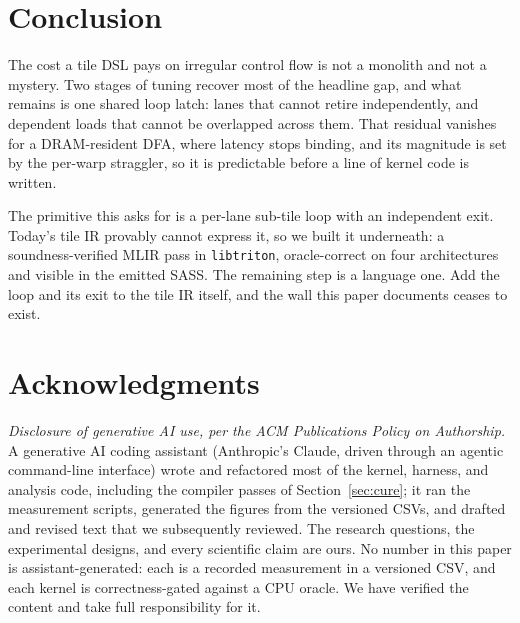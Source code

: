 \documentclass[sigplan,review,nonacm,10pt]{acmart}
\begin{document}
\section{Conclusion}
The cost a tile DSL pays on irregular control flow is not a monolith and not a mystery. Two
stages of tuning recover most of the headline gap, and what remains is one shared loop
latch: lanes that cannot retire independently, and dependent loads that cannot be
overlapped across them. That residual vanishes for a DRAM-resident DFA, where latency stops
binding, and its magnitude is set by the per-warp straggler, so it is predictable before a
line of kernel code is written.

The primitive this asks for is a per-lane sub-tile loop with an independent exit. Today's
tile IR provably cannot express it, so we built it underneath: a soundness-verified MLIR
pass in \texttt{libtriton}, oracle-correct on four architectures and visible in the emitted
SASS. The remaining step is a language one. Add the loop and its exit to the tile IR itself,
and the wall this paper documents ceases to exist.

\clearpage

\section*{Acknowledgments}
\emph{Disclosure of generative AI use, per the ACM Publications Policy on
Authorship.} A generative AI coding assistant (Anthropic's Claude, driven through
an agentic command-line interface) wrote and refactored most of the kernel,
harness, and analysis code, including the compiler passes of
Section~\ref{sec:cure}; it ran the measurement scripts, generated the figures from
the versioned CSVs, and drafted and revised text that we subsequently reviewed. The
research questions, the experimental designs, and every scientific claim are ours.
No number in this paper is assistant-generated: each is a recorded measurement in a
versioned CSV, and each kernel is correctness-gated against a CPU oracle. We have
verified the content and take full responsibility for it.



\end{document}

